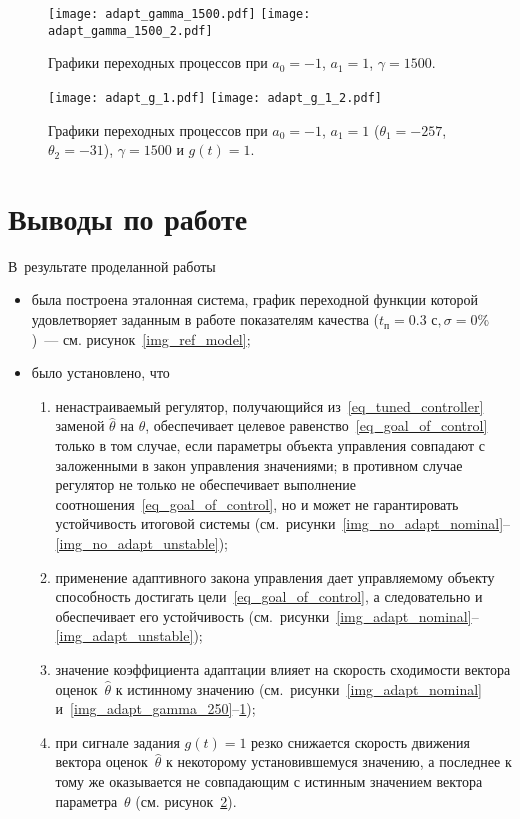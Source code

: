 \begin{figure}[h!]
    \centering
    \texttt{[image: adapt\_gamma\_1500.pdf]}
    \texttt{[image: adapt\_gamma\_1500\_2.pdf]}
    \caption{Графики переходных процессов при $a_0=-1$, $a_1 = 1$, $\gamma = 1500$.}
    \label{img_adapt_gamma_1500}
\end{figure}

\begin{figure}[h!]
    \centering
    \texttt{[image: adapt\_g\_1.pdf]}
    \texttt{[image: adapt\_g\_1\_2.pdf]}
    \caption{Графики переходных процессов при $a_0=-1$, $a_1 = 1$ ($\theta_1 = -257$, $\theta_2 = -31$), $\gamma = 1500$ и $g(t) = 1$.}
    \label{img_adapt_g_1}
\end{figure}

\newpage
\mbox{}
\newpage
\mbox{}
\newpage
\mbox{}
\newpage
\mbox{}
\newpage
\mbox{}
\newpage
\mbox{}
\newpage
\mbox{}
\newpage
\section{Выводы по работе}
В~результате проделанной работы
\begin{itemize}
    \item была построена эталонная система, график переходной функции которой удовлетворяет заданным в работе показателям качества ($t_\text{п} = 0.3 \text{ с}, \sigma = 0\%$)~--- см. рисунок~\ref{img_ref_model};
    \item было установлено, что 
    \begin{enumerate}
        \item ненастраиваемый регулятор, получающийся из~\eqref{eq_tuned_controller} заменой $\hat{\theta}$ на $\theta$, обеспечивает целевое равенство~\eqref{eq_goal_of_control} только в том случае, если параметры объекта управления совпадают с заложенными в закон управления значениями; в противном случае регулятор не только не обеспечивает выполнение соотношения~\eqref{eq_goal_of_control}, но и может не гарантировать устойчивость итоговой системы (см.~рисунки~\ref{img_no_adapt_nominal}--\ref{img_no_adapt_unstable});
        \item применение адаптивного закона управления дает управляемому объекту способность достигать цели~\eqref{eq_goal_of_control}, а следовательно и обеспечивает его устойчивость (см.~рисунки~\ref{img_adapt_nominal}--\ref{img_adapt_unstable});
        \item значение коэффициента адаптации влияет на скорость сходимости вектора оценок~$\hat{\theta}$ к истинному значению (см.~рисунки~\ref{img_adapt_nominal} и~\ref{img_adapt_gamma_250}--\ref{img_adapt_gamma_1500});
        \item при сигнале задания $g(t)=1$ резко снижается скорость движения вектора оценок~$\hat{\theta}$ к некоторому установившемуся значению, а последнее к тому же оказывается не совпадающим с истинным значением вектора параметра~$\theta$ (см. рисунок~\ref{img_adapt_g_1}).
    \end{enumerate}
\end{itemize}